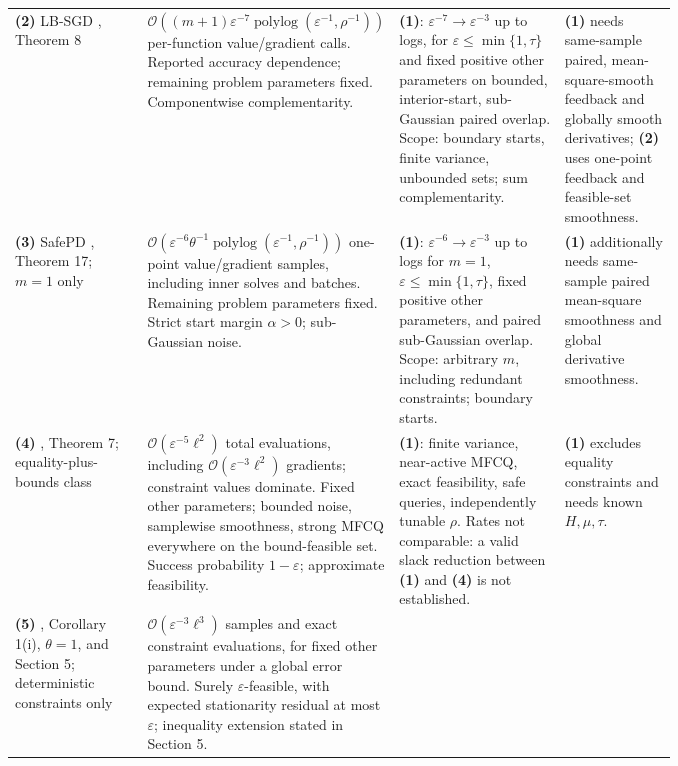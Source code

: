 \begin{table}[tp]
\begin{threeparttable}
\begin{tabularx}{\linewidth}{@{}>{\raggedright\arraybackslash}p{0.20\linewidth}>{\raggedright\arraybackslash}p{0.32\linewidth}>{\raggedright\arraybackslash}p{0.25\linewidth}>{\raggedright\arraybackslash}X@{}}
& & \\
\midrule[1.2pt]
\textbf{(2)} LB-SGD \citep{smfcqUsmanova2024}, Theorem 8
& $\mathcal{O}((m+1)\varepsilon^{-7}\operatorname{polylog}(\varepsilon^{-1},\rho^{-1}))$ per-function value/gradient calls. Reported accuracy dependence; remaining problem parameters fixed. Componentwise complementarity.
& \textbf{(1)}: $\varepsilon^{-7}\to\varepsilon^{-3}$ up to logs, for $\varepsilon\leq\min\{1,\tau\}$ and fixed positive other parameters on bounded, interior-start, sub-Gaussian paired overlap. Scope: boundary starts, finite variance, unbounded sets; sum complementarity.
& \textbf{(1)} needs same-sample paired, mean-square-smooth feedback and globally smooth derivatives; \textbf{(2)} uses one-point feedback and feasible-set smoothness. \\
\midrule
\textbf{(3)} SafePD \citep{smfcqUsmanovaLevy2025v1}, Theorem 17; $m=1$ only
& $\mathcal{O}(\varepsilon^{-6}\theta^{-1}\operatorname{polylog}(\varepsilon^{-1},\rho^{-1}))$ one-point value/gradient samples, including inner solves and batches. Remaining problem parameters fixed. Strict start margin $\alpha>0$; sub-Gaussian noise.
& \textbf{(1)}: $\varepsilon^{-6}\to\varepsilon^{-3}$ up to logs for $m=1$, $\varepsilon\leq\min\{1,\tau\}$, fixed positive other parameters, and paired sub-Gaussian overlap. Scope: arbitrary $m$, including redundant constraints; boundary starts.
& \textbf{(1)} additionally needs same-sample paired mean-square smoothness and global derivative smoothness. \\
\midrule
\textbf{(4)} \citep{cssiShiWangV2}, Theorem 7; equality-plus-bounds class
& $\mathcal{O}(\varepsilon^{-5}\ell^2)$ total evaluations, including $\mathcal{O}(\varepsilon^{-3}\ell^2)$ gradients; constraint values dominate. Fixed other parameters; bounded noise, samplewise smoothness, strong MFCQ everywhere on the bound-feasible set. Success probability $1-\varepsilon$; approximate feasibility.
& \textbf{(1)}: finite variance, near-active MFCQ, exact feasibility, safe queries, independently tunable $\rho$. Rates not comparable: a valid slack reduction between \textbf{(1)} and \textbf{(4)} is not established.
& \textbf{(1)} excludes equality constraints and needs known $H,\mu,\tau$. \\
\midrule
\textbf{(5)} \citep{smfcqLuMeiXiao2025v4}, Corollary 1(i), $\theta=1$, and Section 5; deterministic constraints only
& $\mathcal{O}(\varepsilon^{-3}\ell^3)$ samples and exact constraint evaluations, for fixed other parameters under a global error bound. Surely $\varepsilon$-feasible, with expected stationarity residual at most $\varepsilon$; inequality extension stated in Section 5.

\end{tabularx}
\end{threeparttable}
\end{table}
